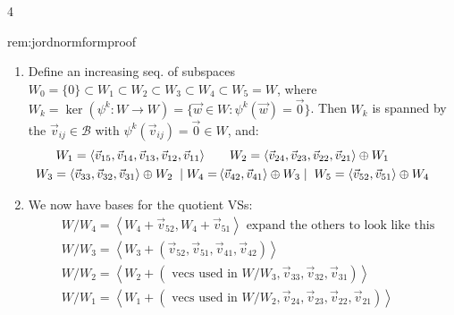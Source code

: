 \documentclass[landscape, 8pt]{extarticle}
\begin{document}
\begin{multicols*}{4}
\begin{rem}{rem:jordnormformproof}{ }
\begin{enumerate}[label=(\arabic*)]
				\item Define an increasing seq. of subspaces $W_0 = \{0\} \subset W_1 \subset W_2 \subset W_3 \subset W_4 \subset W_5 = W$, where $W_k = \ker (\psi^k : W \to W) = \{\vec{w}\in W : \psi^k(\vec{w}) = \vec{0}\}$. Then $W_k$ is spanned by the $\vec{v}_{ij}\in \mathcal{B}$ with $\psi^k(\vec{v}_{ij}) = \vec{0}\in W$, and:
				\begin{align*}
				\hspace*{-4ex} W_1 = \left\langle \vec{v}_{15}, \vec{v}_{14}, \vec{v}_{13}, \vec{v}_{12}, \vec{v}_{11}\right\rangle \quad & \quad W_2 = \left\langle \vec{v}_{24}, \vec{v}_{23}, \vec{v}_{22}, \vec{v}_{21}\right\rangle \oplus W_1 \\
				\hspace*{-4ex} W_3 = \left\langle \vec{v}_{33}, \vec{v}_{32}, \vec{v}_{31}\right\rangle \oplus W_2 \;\;|\; W_4 = &\left\langle \vec{v}_{42}, \vec{v}_{41}\right\rangle  \oplus W_3 \;|\;\; W_5 = \left\langle \vec{v}_{52}, \vec{v}_{51}\right\rangle \oplus W_4
				\end{align*}
				
				\item We now have bases for the quotient VSs:
				\begin{align*}
					&W/W_4 = \left\langle W_4 + \vec{v}_{52}, W_4 + \vec{v}_{51}\right\rangle \text{ expand the others to look like this}\\
					&W/W_3 = \left\langle W_3 + (\vec{v}_{52}, \vec{v}_{51}, \vec{v}_{41}, \vec{v}_{42})\right\rangle\\
					&W/W_2 = \left\langle W_2 + (\text{ vecs used in $W/W_3$}, \vec{v}_{33}, \vec{v}_{32}, \vec{v}_{31})\right\rangle\\
					&W/W_1 = \left\langle W_1 + (\text{ vecs used in $W/W_2$}, \vec{v}_{24}, \vec{v}_{23}, \vec{v}_{22}, \vec{v}_{21})\right\rangle
				\end{align*}
				
			\end{enumerate}
			
		\end{rem}
		

\end{multicols*}
\end{document}
